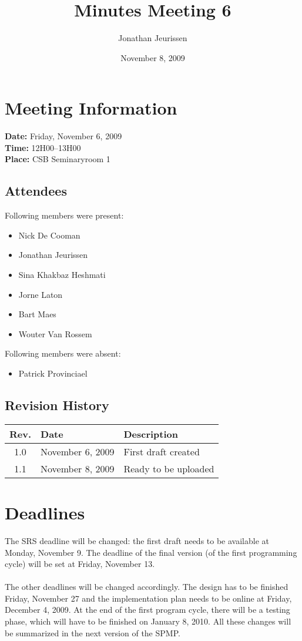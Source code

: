 \documentclass[a4paper, 12pt]{article}
\begin{document}
\title{Minutes Meeting 6}
\author{Jonathan Jeurissen}
\date{November 8, 2009}

\maketitle	
	\section{Meeting Information}
		\textbf{Date:} Friday, November 6, 2009\\
		\textbf{Time:} 12H00--13H00\\
		\textbf{Place:} CSB Seminaryroom 1\\
		\subsection{Attendees}
Following members were present:
			\begin{itemize}
				\item Nick De Cooman
				\item Jonathan Jeurissen
				\item Sina Khakbaz Heshmati
				\item Jorne Laton
				\item Bart Maes
				\item Wouter Van Rossem
			\end{itemize}
Following members were absent:
			\begin{itemize}
				\item Patrick Provinciael
			\end{itemize}
			
		\subsection{Revision History}
			\begin{tabular}{c | l | l }
				\textbf{Rev.} & \textbf{Date} & \textbf{Description} \\
				\hline
				1.0 & November 6, 2009 & First draft created \\
				1.1 & November 8, 2009 & Ready to be uploaded \\
			\end{tabular}		

	\section{Deadlines}
The SRS deadline will be changed: the first draft needs to be available at Monday, November 9. The deadline of the final version (of the first programming cycle) will be set at Friday, November 13.\\ \\ 
The other deadlines will be changed accordingly.
The design has to be finished Friday, November 27 and the implementation plan needs to be online at Friday, December 4, 2009. At the end of the first program cycle, there will be a testing phase, which will have to be finished on January 8, 2010. All these changes will be summarized in the next version of the SPMP.\\
\end{document}
